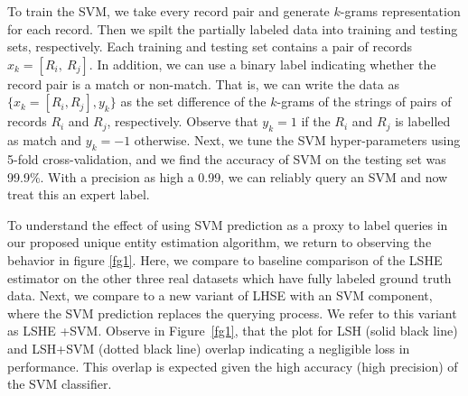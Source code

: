 \documentclass[aoas]{imsart}
\begin{document}
To train the SVM, we take every record pair and generate $k$-grams representation for each record. Then we spilt the partially labeled data into training and testing sets, respectively. Each training and testing set contains a pair of records $x_k = [R_i,\ R_j]$. In addition, we can use a binary label indicating whether the record pair is a match or non-match. That is, we can write the data as $\{x_k =[R_i,R_j],y_k\}$ as the set difference of the $k$-grams of the strings of pairs of records $R_i$ and $R_j$, respectively. Observe that $y_k = 1$ if the $R_i$ and $R_j$ is labelled as match and $y_k = -1$ otherwise. Next, we tune the SVM hyper-parameters using 5-fold cross-validation, and we find the accuracy of SVM on the testing set was 99.9\%.  With a precision as high a 0.99, we can reliably query an SVM and now treat this an expert label.



%
%


To understand the effect of using SVM prediction as a proxy to label queries in our proposed unique entity estimation algorithm, we return to observing the behavior in figure \ref{fg1}. Here, we compare to baseline comparison of the LSHE estimator on the other three real datasets which have fully labeled ground truth data. Next, we compare to a new variant of LHSE with an SVM component, where the SVM prediction replaces the querying process. We refer to this variant as LSHE +SVM. Observe in  Figure~\ref{fg1}, that the plot for LSH (solid black line) and LSH+SVM (dotted black line) overlap indicating a negligible loss in performance. This overlap is expected given the high accuracy (high precision) of the SVM classifier.
\end{document}
